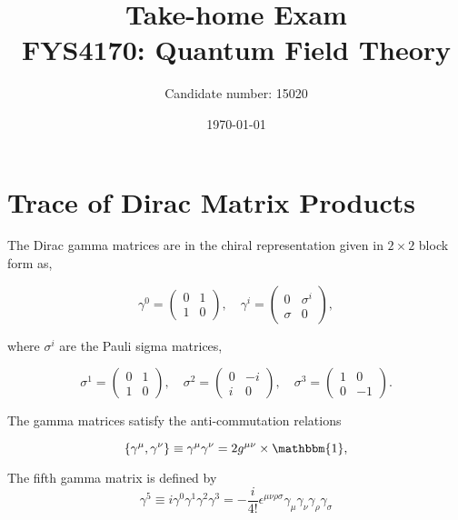 \documentclass[11pt, a4paper]{amsart}
\title[FYS4170: Take-home Exam]{Take-home Exam \\
   \hrulefill \small{ FYS4170: Quantum Field Theory }\hrulefill}
\author[15020]{Candidate number: 15020}
\date{\today}
\begin{document}
 
\maketitle

\section{Trace of Dirac Matrix Products}

The Dirac gamma matrices are in the chiral representation given in $2\times 2$ block form as,

\begin{equation}
\gamma^0 = \begin{pmatrix}
0 & 1 \\ 1 & 0
\end{pmatrix}, \quad
\gamma^i = \begin{pmatrix}
0 & \sigma^i \\ \sigma & 0
\end{pmatrix},
\end{equation}

where $\sigma^i$ are the Pauli sigma matrices,

\begin{equation}
\sigma^1 = \begin{pmatrix}
0 &  1 \\ 1 & 0
\end{pmatrix},
\quad
\sigma^2 = \begin{pmatrix}
0 & -i \\ i & 0
\end{pmatrix},
\quad
\sigma^3 = \begin{pmatrix}
1 & 0 \\ 0 & -1
\end{pmatrix}.
\end{equation}

The gamma matrices satisfy the anti-commutation relations

\begin{equation}
\label{eq:gamma_anti_comm}
\{\gamma^\mu, \gamma^\nu\} \equiv \gamma^\mu \gamma^\nu = 2g^{\mu\nu} \times \mathbbm{1},
\end{equation}

The fifth gamma matrix is defined by
\begin{equation}
\gamma^5 \equiv i \gamma^0 \gamma^1 \gamma^2 \gamma^3 
= -\frac{i}{4!}\epsilon^{\mu\nu\rho\sigma}\gamma_\mu\gamma_\nu\gamma_\rho\gamma_\sigma
\end{equation}
\end{document}
